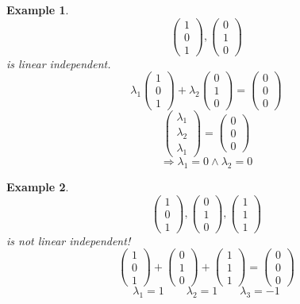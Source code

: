 \documentclass[a4paper,landscape,twocolumn]{article}
\newtheorem{ex}{Example}
\begin{document}
\begin{ex}
  \[ \begin{pmatrix}1 \\ 0 \\ 1 \end{pmatrix}, \begin{pmatrix} 0 \\ 1 \\ 0 \end{pmatrix} \]
  is linear independent.
  \[ \lambda_1 \begin{pmatrix} 1 \\ 0 \\ 1 \end{pmatrix} + \lambda_2 \begin{pmatrix} 0 \\ 1 \\ 0 \end{pmatrix} = \begin{pmatrix} 0 \\ 0 \\ 0 \end{pmatrix} \]
  \[ \begin{pmatrix} \lambda_1 \\ \lambda_2 \\ \lambda_1 \end{pmatrix} = \begin{pmatrix} 0 \\ 0 \\ 0 \end{pmatrix} \]
  \[ \Rightarrow \lambda_1 = 0 \land \lambda_2 = 0 \]
\end{ex}

\begin{ex}
  \[ \begin{pmatrix} 1 \\ 0 \\ 1 \end{pmatrix}, \begin{pmatrix} 0 \\ 1 \\ 0 \end{pmatrix}, \begin{pmatrix} 1 \\ 1 \\ 1 \end{pmatrix} \]
  is not linear independent!
  \[ \begin{pmatrix} 1 \\ 0 \\ 1 \end{pmatrix} + \begin{pmatrix} 0 \\ 1 \\ 0 \end{pmatrix} + \begin{pmatrix} 1 \\ 1 \\ 1 \end{pmatrix} = \begin{pmatrix} 0 \\ 0 \\ 0 \end{pmatrix} \]
  \[ \lambda_1 =  1 \qquad \lambda_2 = 1 \qquad \lambda_3 = -1 \]
\end{ex}
\end{document}
